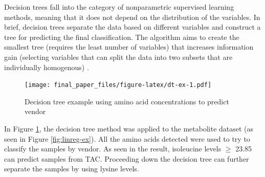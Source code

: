 \documentclass[12pt,openany]{book}
\newenvironment{Shaded}{\begin{snugshade}}{\end{snugshade}}
\newcommand{\KeywordTok}[1]{\textcolor[rgb]{0.13,0.29,0.53}{\textbf{#1}}}
\newcommand{\DataTypeTok}[1]{\textcolor[rgb]{0.13,0.29,0.53}{#1}}
\newcommand{\DecValTok}[1]{\textcolor[rgb]{0.00,0.00,0.81}{#1}}
\newcommand{\StringTok}[1]{\textcolor[rgb]{0.31,0.60,0.02}{#1}}
\newcommand{\OperatorTok}[1]{\textcolor[rgb]{0.81,0.36,0.00}{\textbf{#1}}}
\newcommand{\NormalTok}[1]{#1}
\begin{document}
Decision trees fall into the category of nonparametric supervised
learning methods, meaning that it does not depend on the distribution of
the variables. In brief, decision trees separate the data based on
different variables and construct a tree for predicting the final
classification. The algorithm aims to create the smallest tree (requires
the least number of variables) that increases information gain
(selecting variables that can split the data into two subsets that are
individually homogenous) \citep{dt}.

\begin{Shaded}
\end{Shaded}

\begin{figure}
\centering
\texttt{[image: final\_paper\_files/figure-latex/dt-ex-1.pdf]}
\caption{\label{fig:dt-ex}Decision tree example using amino acid
concentrations to predict vendor}
\end{figure}

In Figure \ref{fig:dt-ex}, the decision tree method was applied to the
metabolite dataset (as seen in Figure \ref{fig:linreg-ex}). All the
amino acids detected were used to try to classify the samples by vendor.
As seen in the result, isoleucine levels \(\geq\) 23.85 can predict
samples from TAC. Proceeding down the decision tree can further separate
the samples by using lysine levels.
\end{document}
